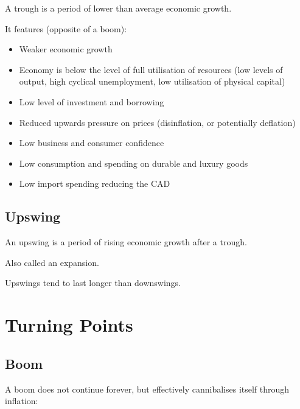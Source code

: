 \documentclass[a4paper,11pt]{article}
\begin{document}
A trough is a period of lower than average economic growth.

It features (opposite of a boom):

\begin{itemize}
\item Weaker economic growth
\item Economy is below the level of full utilisation of resources (low levels
	of output, high cyclical unemployment, low utilisation of physical capital)
\item Low level of investment and borrowing
\item Reduced upwards pressure on prices (disinflation, or potentially
	deflation)
\item Low business and consumer confidence
\item Low consumption and spending on durable and luxury goods
\item Low import spending reducing the CAD
\end{itemize}


\subsection{Upswing}

An upswing is a period of rising economic growth after a trough.

Also called an expansion.

Upswings tend to last longer than downswings.




\section{Turning Points}

\subsection{Boom}

A boom does not continue forever, but effectively cannibalises itself through
inflation:
\end{document}
